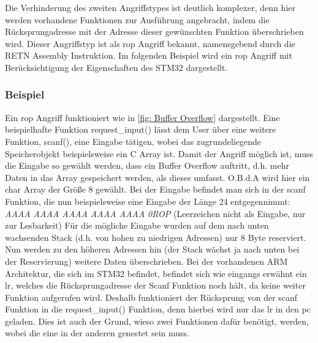 \documentclass[a4paper,
DIV=13,
12pt,
BCOR=10mm,
department=FakIM,
oneside,
parskip=half,
automark,
listof=totocnumbered,
bibliography=totocnumbered,
acronym=totocnumbered
] {OTHRartcl}
\begin{document}
Die Verhinderung des zweiten Angriffstypes ist deutlich komplexer, denn hier werden vorhandene Funktionen zur Ausführung angebracht, indem die Rücksprungadresse mit der Adresse
dieser gewünschten Funktion überschrieben wird. %
Dieser Angriffstyp ist als \ac{rop} Angriff bekannt, namensgebend durch die RETN Assembly Instruktion.
Im folgenden Beispiel wird ein \ac{rop} Angriff mit Berücksichtigung der Eigenschaften des STM32 dargestellt.

\subsubsection{Beispiel}
Ein \ac{rop} Angriff funktioniert wie in \autoref{fig: Buffer Overflow} dargestellt.
Eine beispielhafte Funktion request\_input() lässt dem User über eine weitere Funktion, scanf(), eine Eingabe tätigen, wobei das zugrundeliegende Speicherobjekt beispielsweise ein C Array ist.
Damit der Angriff möglich ist, muss die Eingabe so gewählt werden, dass ein Buffer Overflow auftritt, d.h. mehr Daten in das Array gespeichert werden, als dieses umfasst.
O.B.d.A wird hier ein char Array der Größe 8 gewählt. Bei der Eingabe befindet man sich in der scanf Funktion, die nun beispielsweise eine Eingabe der Länge 24 entgegennimmt:
\textit{AAAA AAAA AAAA AAAA AAAA 0ROP}  (Leerzeichen nicht als Eingabe, nur zur Lesbarkeit)
Für die mögliche Eingabe wurden auf dem nach unten wachsenden Stack (d.h. von hohen zu niedrigen Adressen) nur 8 Byte reserviert.
Nun werden zu den höheren Adressen hin (der Stack wächst ja nach unten bei der Reservierung) weitere Daten überschrieben.
Bei der vorhandenen ARM Architektur, die sich im STM32 befindet, befindet sich wie eingangs erwähnt ein \ac{lr}, welches die Rücksprungadresse der Scanf Funktion noch hält, da keine weiter Funktion aufgerufen wird.
Deshalb funktioniert der Rücksprung von der scanf Funktion in die request\_input() Funktion, denn hierbei wird nur das \ac{lr} in den \ac{pc} geladen.
Dies ist auch der Grund, wieso zwei Funktionen dafür benötigt, werden, wobei die eine in der anderen genestet sein muss.
\end{document}

